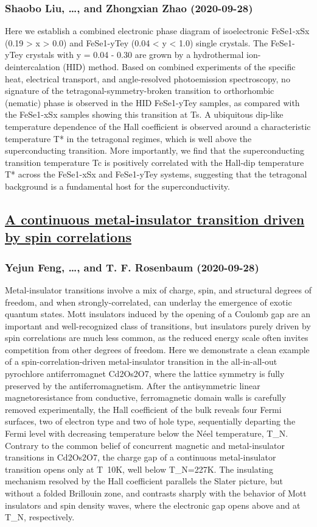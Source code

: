 \subsubsection*{Shaobo Liu, \dots, and Zhongxian Zhao (2020-09-28)}
Here we establish a combined electronic phase diagram of isoelectronic
FeSe1-xSx (0.19 > x > 0.0) and FeSe1-yTey (0.04 < y < 1.0) single crystals. The
FeSe1-yTey crystals with y = 0.04 - 0.30 are grown by a hydrothermal
ion-deintercalation (HID) method. Based on combined experiments of the specific
heat, electrical transport, and angle-resolved photoemission spectroscopy, no
signature of the tetragonal-symmetry-broken transition to orthorhombic
(nematic) phase is observed in the HID FeSe1-yTey samples, as compared with the
FeSe1-xSx samples showing this transition at Ts. A ubiquitous dip-like
temperature dependence of the Hall coefficient is observed around a
characteristic temperature T* in the tetragonal regimes, which is well above
the superconducting transition. More importantly, we find that the
superconducting transition temperature Tc is positively correlated with the
Hall-dip temperature T* across the FeSe1-xSx and FeSe1-yTey systems, suggesting
that the tetragonal background is a fundamental host for the superconductivity.

\subsection*{\href{http://arxiv.org/abs/2009.13277v1}{A continuous metal-insulator transition driven by spin correlations}}
\subsubsection*{Yejun Feng, \dots, and T. F. Rosenbaum (2020-09-28)}
Metal-insulator transitions involve a mix of charge, spin, and structural
degrees of freedom, and when strongly-correlated, can underlay the emergence of
exotic quantum states. Mott insulators induced by the opening of a Coulomb gap
are an important and well-recognized class of transitions, but insulators
purely driven by spin correlations are much less common, as the reduced energy
scale often invites competition from other degrees of freedom. Here we
demonstrate a clean example of a spin-correlation-driven metal-insulator
transition in the all-in-all-out pyrochlore antiferromagnet Cd2Os2O7, where the
lattice symmetry is fully preserved by the antiferromagnetism. After the
antisymmetric linear magnetoresistance from conductive, ferromagnetic domain
walls is carefully removed experimentally, the Hall coefficient of the bulk
reveals four Fermi surfaces, two of electron type and two of hole type,
sequentially departing the Fermi level with decreasing temperature below the
N\'eel temperature, T\_N. Contrary to the common belief of concurrent magnetic
and metal-insulator transitions in Cd2Os2O7, the charge gap of a continuous
metal-insulator transition opens only at T~10K, well below T\_N=227K. The
insulating mechanism resolved by the Hall coefficient parallels the Slater
picture, but without a folded Brillouin zone, and contrasts sharply with the
behavior of Mott insulators and spin density waves, where the electronic gap
opens above and at T\_N, respectively.

